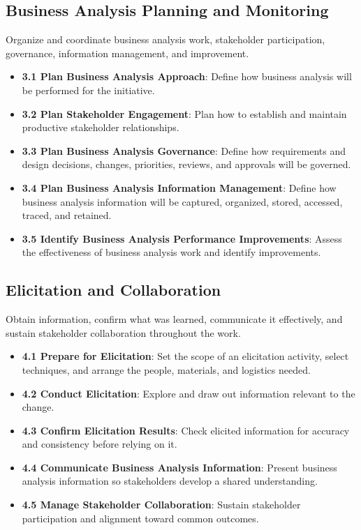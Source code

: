 \documentclass[11pt]{article}
\begin{document}
\subsection{Business Analysis Planning and Monitoring}
Organize and coordinate business analysis work, stakeholder participation, governance, information management, and improvement.
\begin{itemize}
\item \textbf{3.1 Plan Business Analysis Approach}: Define how business analysis will be performed for the initiative.
\item \textbf{3.2 Plan Stakeholder Engagement}: Plan how to establish and maintain productive stakeholder relationships.
\item \textbf{3.3 Plan Business Analysis Governance}: Define how requirements and design decisions, changes, priorities, reviews, and approvals will be governed.
\item \textbf{3.4 Plan Business Analysis Information Management}: Define how business analysis information will be captured, organized, stored, accessed, traced, and retained.
\item \textbf{3.5 Identify Business Analysis Performance Improvements}: Assess the effectiveness of business analysis work and identify improvements.
\end{itemize}
\subsection{Elicitation and Collaboration}
Obtain information, confirm what was learned, communicate it effectively, and sustain stakeholder collaboration throughout the work.
\begin{itemize}
\item \textbf{4.1 Prepare for Elicitation}: Set the scope of an elicitation activity, select techniques, and arrange the people, materials, and logistics needed.
\item \textbf{4.2 Conduct Elicitation}: Explore and draw out information relevant to the change.
\item \textbf{4.3 Confirm Elicitation Results}: Check elicited information for accuracy and consistency before relying on it.
\item \textbf{4.4 Communicate Business Analysis Information}: Present business analysis information so stakeholders develop a shared understanding.
\item \textbf{4.5 Manage Stakeholder Collaboration}: Sustain stakeholder participation and alignment toward common outcomes.
\end{itemize}
\end{document}
